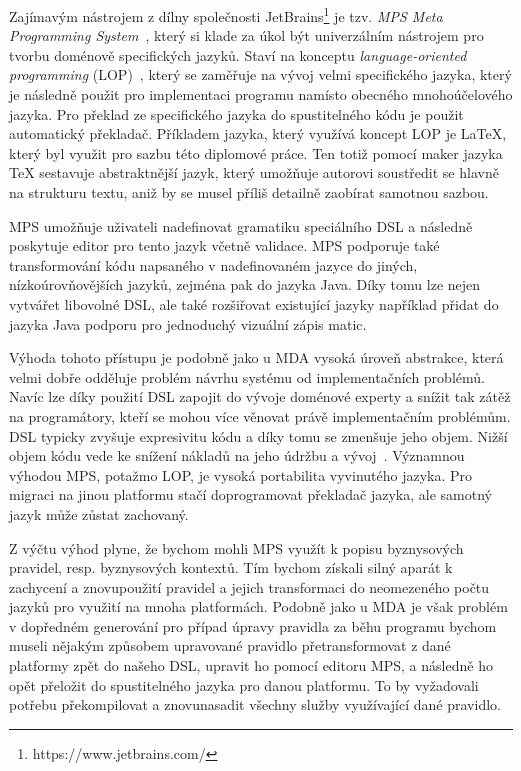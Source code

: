 Zajímavým nástrojem z dílny společnosti JetBrains\footnote{https://www.jetbrains.com/}
je tzv. \textit{MPS \textendash\xspace Meta Programming System}~\cite{jetbrainsmps}, který si klade za úkol být univerzálním
nástrojem pro tvorbu doménově specifických jazyků. Staví na konceptu \textit{language-oriented
programming} (\gls{LOP})~\cite{ward1994language}, který se zaměřuje na vývoj velmi specifického jazyka,
který je následně použit pro implementaci programu namísto obecného mnohoúčelového jazyka. Pro překlad
ze specifického jazyka do spustitelného kódu je použit automatický překladač. Příkladem jazyka, který využívá koncept \gls{LOP}
je \LaTeX\xspace, který byl využit pro sazbu této diplomové práce. Ten totiž pomocí maker jazyka \TeX\xspace
sestavuje abstraktnější jazyk, který umožňuje autorovi soustředit se hlavně na strukturu textu, aniž by
se musel příliš detailně zaobírat samotnou sazbou.

MPS umožňuje uživateli nadefinovat gramatiku speciálního \gls{DSL} a následně poskytuje
editor pro tento jazyk včetně validace. MPS podporuje také transformování kódu napsaného
v nadefinovaném jazyce do jiných, nízkoúrovňovějších jazyků, zejména pak do jazyka Java.
Díky tomu lze nejen vytvářet libovolné \gls{DSL}, ale také rozšiřovat existující
jazyky \textendash například přidat do jazyka Java podporu pro jednoduchý vizuální zápis matic.

Výhoda tohoto přístupu je podobně jako u \gls{MDA} vysoká úroveň abstrakce, která
velmi dobře odděluje problém návrhu systému od implementačních problémů.
Navíc lze díky použití \gls{DSL} zapojit do vývoje doménové experty a snížit tak
zátěž na programátory, kteří se mohou více věnovat právě implementačním problémům.
\gls{DSL} typicky zvyšuje expresivitu kódu a díky tomu se zmenšuje jeho objem.
Nižší objem kódu vede ke snížení nákladů na jeho údržbu a vývoj~\cite{littman1987mental}\cite{soloway1986empirical}.
Významnou výhodou MPS, potažmo \gls{LOP}, je vysoká portabilita vyvinutého jazyka.
Pro migraci na jinou platformu stačí doprogramovat překladač jazyka, ale
samotný jazyk může zůstat zachovaný.

Z výčtu výhod plyne, že bychom mohli MPS využít k popisu byznysových pravidel,
resp. byznysových kontextů. Tím bychom získali silný aparát k zachycení a
znovupoužití pravidel a jejich transformaci do neomezeného počtu jazyků pro
využití na mnoha platformách. Podobně jako u \gls{MDA} je však problém v dopředném
generování \textendash pro případ úpravy pravidla za běhu programu bychom museli
nějakým způsobem upravované pravidlo přetransformovat z dané platformy zpět
do našeho \gls{DSL}, upravit ho pomocí editoru MPS, a následně ho opět přeložit
do spustitelného jazyka pro danou platformu. To by vyžadovali potřebu překompilovat
a znovunasadit všechny služby využívající dané pravidlo.


